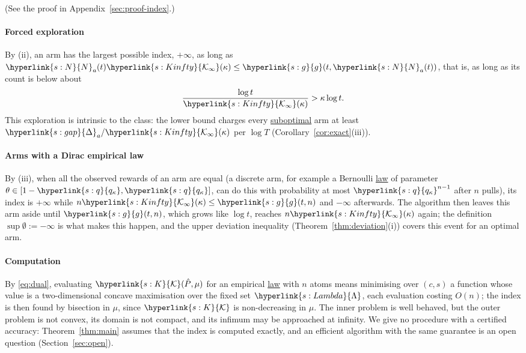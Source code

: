\documentclass[11pt]{article}
\newcommand{\sy}[2]{{\hyperlink{#1}{#2}}}
\newcommand{\term}[2]{\hyperlink{#1}{#2}}
\newcommand{\gap}{\sy{s:gap}{\Delta}}
\newcommand{\Kc}{\sy{s:K}{\mathcal{K}}}
\newcommand{\Lam}{\sy{s:Lambda}{\Lambda}}
\newcommand{\qk}{\sy{s:q}{q_{\kappa}}}
\newcommand{\Kinfty}{\sy{s:Kinfty}{\mathcal{K}_{\infty}}}
\newcommand{\Np}{\sy{s:N}{N}}
\newcommand{\thr}{\sy{s:g}{g}}
\begin{document}
(See the proof in Appendix~\ref{sec:proof-index}.)

\paragraph{Forced exploration} By (ii), an arm has the largest possible index, $+\infty$, as long as
$\Np_a(t)\Kinfty(\kappa)\le\thr(t,\Np_a(t))$, that is, as long as its count is below about
\begin{equation*}
  \frac{\log t}{\Kinfty(\kappa)}>\kappa\log t .
\end{equation*}
This exploration is intrinsic to the class: the lower bound charges every \term{w:subopt}{suboptimal} arm at least
$\gap_a/\Kinfty(\kappa)$ per $\log T$ (Corollary~\ref{cor:exact}(iii)).

\paragraph{Arms with a Dirac empirical law} By (iii), when all the observed rewards of an arm are equal (a
discrete arm, for example a Bernoulli \term{w:law}{law} of parameter $\theta\in[1-\qk,\qk]$, can do this with probability
at most $\qk^{n-1}$ after $n$ pulls), its index is $+\infty$ while $n\Kinfty(\kappa)\le\thr(t,n)$ and
$-\infty$ afterwards. The algorithm then leaves this arm aside until $\thr(t,n)$, which grows like $\log t$,
reaches $n\Kinfty(\kappa)$ again; the definition $\sup\emptyset:=-\infty$ is what makes this happen, and the
upper deviation inequality (Theorem~\ref{thm:deviation}(i)) covers this event for an optimal arm.

\paragraph{Computation} By \eqref{eq:dual}, evaluating $\Kc(\hat P,\mu)$ for an empirical \term{w:law}{law} with $n$ atoms means
minimising over $(c,s)$ a function whose value is a two-dimensional concave maximisation over the fixed set
$\Lam$, each evaluation costing $O(n)$; the index is then found by bisection in $\mu$, since $\Kc$ is
non-decreasing in $\mu$. The inner problem is well behaved, but the outer problem is not convex, its domain is
not compact, and its infimum may be approached at infinity. We give no procedure with a certified accuracy:
Theorem~\ref{thm:main} assumes that the index is computed exactly, and an efficient algorithm with the same
guarantee is an open question (Section~\ref{sec:open}).
\end{document}
